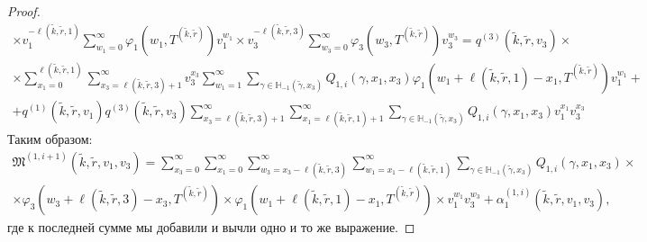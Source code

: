 \documentclass[a4paper,12pt,russian]{extarticle}
\begin{document}
\begin{proof}
\begin{multline*}
   \times v_1^{ - \ell(\tilde{k},\tilde{r},1)} \sum_{w_1=0}^{\infty} \varphi_1(w_1,T^{(\tilde{k},\tilde{r})})   v_1^{w_1}  \times v_3^{ -\ell(\tilde{k},\tilde{r},3)} \sum_{w_3=0 }^{\infty} \varphi_3(w_3,T^{(\tilde{k},\tilde{r})}) v_3^{w_3}  =q^{(3)}(\tilde{k},\tilde{r},v_3) \times\\
    \times  \sum_{x_1=0}^{\ell(\tilde{k},\tilde{r},1)}\sum_{x_3=\ell(\tilde{k},\tilde{r},3)+1}^{\infty}  v_3^{x_3} \sum_{w_1=1}^{\infty}   \sum_{\gamma \in {\mathbb H}_{-1}(\tilde{\gamma},x_3)} Q_{1,i}(\gamma,x_1, x_3)\varphi_1(w_1 + \ell(\tilde{k},\tilde{r},1) - x_1,T^{(\tilde{k},\tilde{r})})v_1^{w_1} + \\
    + q^{(1)}(\tilde{k},\tilde{r},v_1) q^{(3)}(\tilde{k},\tilde{r},v_3)\sum_{x_3=\ell(\tilde{k},\tilde{r},3)+1}^{\infty} \sum_{x_1=\ell(\tilde{k},\tilde{r},1)+1}^{\infty}    \sum_{\gamma \in {\mathbb H}_{-1}(\tilde{\gamma},x_3)}Q_{1,i}(\gamma,x_1, x_3) v_1^{x_1} v_3^{ x_3}
\end{multline*}
Таким образом:
\begin{multline*}
    \mathfrak{M}^{(1,i+1)}(\tilde{k},\tilde{r},v_1,v_3)  =\sum_{x_3=0}^{\infty} \sum_{x_1=0}^{\infty} \sum_{w_3=x_3 -\ell(\tilde{k},\tilde{r},3) }^{\infty}   \sum_{w_1=x_1-\ell(\tilde{k},\tilde{r},1)}^{\infty}  \sum_{\gamma \in {\mathbb H}_{-1}(\tilde{\gamma},x_3)}Q_{1,i}(\gamma,x_1, x_3) \times  \\
   \times \varphi_3(w_3 + \ell(\tilde{k},\tilde{r},3) - x_3,T^{(\tilde{k},\tilde{r})})  \times \varphi_1(w_1 + \ell(\tilde{k},\tilde{r},1) - x_1,T^{(\tilde{k},\tilde{r})})  \times v_1^{w_1} v_3^{w_3} + \alpha_1^{(1,i)}(\tilde{k},\tilde{r},v_1,v_3),
\end{multline*}
где к последней сумме мы добавили и вычли одно и то же выражение.


\end{proof}
\end{document}

